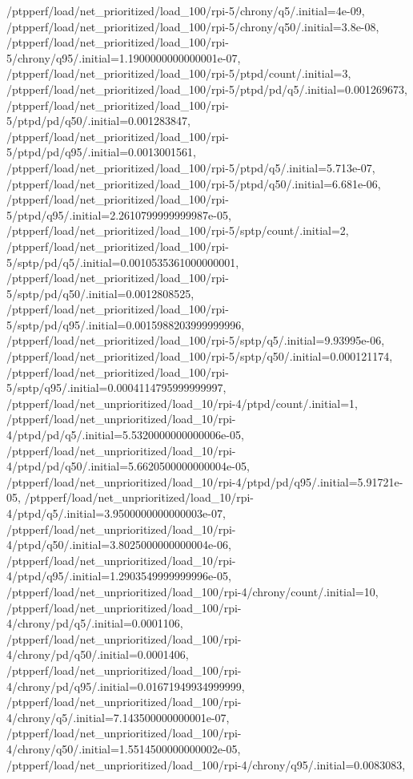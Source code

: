 {    /ptpperf/load/net_prioritized/load_100/rpi-5/chrony/q5/.initial=4e-09,
    /ptpperf/load/net_prioritized/load_100/rpi-5/chrony/q50/.initial=3.8e-08,
    /ptpperf/load/net_prioritized/load_100/rpi-5/chrony/q95/.initial=1.1900000000000001e-07,
    /ptpperf/load/net_prioritized/load_100/rpi-5/ptpd/count/.initial=3,
    /ptpperf/load/net_prioritized/load_100/rpi-5/ptpd/pd/q5/.initial=0.001269673,
    /ptpperf/load/net_prioritized/load_100/rpi-5/ptpd/pd/q50/.initial=0.001283847,
    /ptpperf/load/net_prioritized/load_100/rpi-5/ptpd/pd/q95/.initial=0.0013001561,
    /ptpperf/load/net_prioritized/load_100/rpi-5/ptpd/q5/.initial=5.713e-07,
    /ptpperf/load/net_prioritized/load_100/rpi-5/ptpd/q50/.initial=6.681e-06,
    /ptpperf/load/net_prioritized/load_100/rpi-5/ptpd/q95/.initial=2.2610799999999987e-05,
    /ptpperf/load/net_prioritized/load_100/rpi-5/sptp/count/.initial=2,
    /ptpperf/load/net_prioritized/load_100/rpi-5/sptp/pd/q5/.initial=0.0010535361000000001,
    /ptpperf/load/net_prioritized/load_100/rpi-5/sptp/pd/q50/.initial=0.0012808525,
    /ptpperf/load/net_prioritized/load_100/rpi-5/sptp/pd/q95/.initial=0.0015988203999999996,
    /ptpperf/load/net_prioritized/load_100/rpi-5/sptp/q5/.initial=9.93995e-06,
    /ptpperf/load/net_prioritized/load_100/rpi-5/sptp/q50/.initial=0.000121174,
    /ptpperf/load/net_prioritized/load_100/rpi-5/sptp/q95/.initial=0.0004114795999999997,
    /ptpperf/load/net_unprioritized/load_10/rpi-4/ptpd/count/.initial=1,
    /ptpperf/load/net_unprioritized/load_10/rpi-4/ptpd/pd/q5/.initial=5.5320000000000006e-05,
    /ptpperf/load/net_unprioritized/load_10/rpi-4/ptpd/pd/q50/.initial=5.6620500000000004e-05,
    /ptpperf/load/net_unprioritized/load_10/rpi-4/ptpd/pd/q95/.initial=5.91721e-05,
    /ptpperf/load/net_unprioritized/load_10/rpi-4/ptpd/q5/.initial=3.9500000000000003e-07,
    /ptpperf/load/net_unprioritized/load_10/rpi-4/ptpd/q50/.initial=3.8025000000000004e-06,
    /ptpperf/load/net_unprioritized/load_10/rpi-4/ptpd/q95/.initial=1.2903549999999996e-05,
    /ptpperf/load/net_unprioritized/load_100/rpi-4/chrony/count/.initial=10,
    /ptpperf/load/net_unprioritized/load_100/rpi-4/chrony/pd/q5/.initial=0.0001106,
    /ptpperf/load/net_unprioritized/load_100/rpi-4/chrony/pd/q50/.initial=0.0001406,
    /ptpperf/load/net_unprioritized/load_100/rpi-4/chrony/pd/q95/.initial=0.01671949934999999,
    /ptpperf/load/net_unprioritized/load_100/rpi-4/chrony/q5/.initial=7.143500000000001e-07,
    /ptpperf/load/net_unprioritized/load_100/rpi-4/chrony/q50/.initial=1.5514500000000002e-05,
    /ptpperf/load/net_unprioritized/load_100/rpi-4/chrony/q95/.initial=0.0083083,
}

